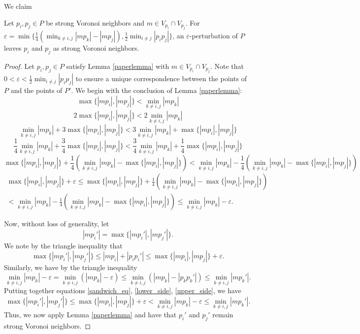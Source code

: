 \documentclass[letterpaper,titlepage]{article}
\begin{document}
    We claim
    \begin{thm}
    Let $p_i,p_j \in P$ be strong Voronoi neighbors and $m \in V_{p_i} \cap V_{p_j}$. For $\varepsilon = \min\{\frac{1}{4}(\min_{k \neq i,j}|mp_k|-|mp_j|), \frac{1}{2}\min_{i \neq j} |p_i p_j|\}$, an $\varepsilon$-perturbation of $P$ leaves $p_i$ and $p_j$ as strong Voronoi neighbors.
    \end{thm}
    \begin{proof}
        Let $p_i,p_j \in P$ satisfy Lemma \ref{paperlemma} with $m \in V_{p_i} \cap V_{p_j}$. Note that $0<\varepsilon<\frac{1}{2}\min_{i \neq j} |p_i p_j|$ to ensure a unique correspondence between the points of $P$ and the points of $P'$. We begin with the conclusion of Lemma \ref{paperlemma}:
        $$\max\{|mp_i|,|mp_j|\} < \min_{k \neq i,j}|mp_k|$$
        $$2\max\{|mp_i|,|mp_j|\} < 2\min_{k \neq i,j}|mp_k|$$
        $$\min_{k \neq i,j}|mp_k|+3\max\{|mp_i|,|mp_j|\} < 3\min_{k \neq i,j}|mp_k|+\max\{|mp_i|,|mp_j|\}$$
        $$\frac{1}{4}\min_{k \neq i,j}|mp_k| +\frac{3}{4}\max\{|mp_i|,|mp_j|\} < \frac{3}{4}\min_{k \neq i,j}|mp_k| + \frac{1}{4}\max\{|mp_i|,|mp_j|\}$$
        $$\max\{|mp_i|,|mp_j|\}+\frac{1}{4}(\min_{k \neq i,j}|mp_k|-\max\{|mp_i|,|mp_j|\}) < \min_{k \neq i,j}|mp_k| -\frac{1}{4}(\min_{k \neq i,j}|mp_k|-\max\{|mp_i|,|mp_j|\})$$
        \begin{equation} \label{sandwich_eq}
        \begin{aligned}
            \max\{|mp_i|,|mp_j|\}+\varepsilon \leq \max\{|mp_i|,|mp_j|\}+\frac{1}{4}(\min_{k \neq i,j}|mp_k|-\max\{|mp_i|,|mp_j|\}) \\ < \min_{k \neq i,j}|mp_k| -\frac{1}{4}(\min_{k \neq i,j}|mp_k|-\max\{|mp_i|,|mp_j|\})\leq \min_{k \neq i,j}|mp_k| - \varepsilon.
        \end{aligned}
        \end{equation}
        
        Now, without loss of generality, let
        $$|mp_i'| = \max\{|mp_i'|,|mp_j'|\}.$$
        We note by the triangle inequality that
        \begin{equation}\label{lower_side}
            \max\{|mp_i'|,|mp_j'|\} \leq |mp_i| + |p_ip_i'| \leq \max\{|mp_i|,|mp_j|\} + \varepsilon.
        \end{equation}
        Similarly, we have by the triangle inequality
        \begin{equation}\label{upper_side}
            \min_{k\neq i,j}|mp_k| - \varepsilon = \min_{k\neq i,j}(|mp_k| - \varepsilon) \leq \min_{k\neq i,j}(|mp_k|-|p_kp_k'|) \leq \min_{k \neq i,j} |mp_k'|.
        \end{equation}
        Putting together equations \ref{sandwich_eq}, \ref{lower_side}, \ref{upper_side}, we have
        $$\max\{|mp_i'|,|mp_j'|\} \leq \max\{|mp_i|,|mp_j|\}+\varepsilon < \min_{k \neq i,j}|mp_k| - \varepsilon \leq \min_{k \neq i,j} |mp_k'|.$$
        Thus, we now apply Lemma \ref{paperlemma} and have that $p_i'$ and $p_j'$ remain strong Voronoi neighbors.
    \end{proof}
\end{document}
